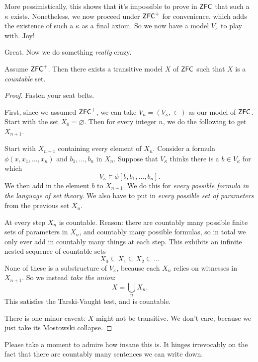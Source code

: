 More pessimistically,
this shows that it's impossible to prove in $\mathsf{ZFC}$ that such a $\kappa$ exists.
Nonetheless, we now proceed under $\mathsf{ZFC}^+$ for convenience,
which adds the existence of such a $\kappa$
as a final axiom.
So we now have a model $V_\kappa$ to play with. Joy!

Great. Now we do something \emph{really} crazy.
\begin{theorem}
	Assume $\mathsf{ZFC}^+$. Then there exists a transitive model $X$ of $\mathsf{ZFC}$
	such that $X$ is a \emph{countable} set.
\end{theorem}
\begin{proof}
	Fasten your seat belts.

	First, since we assumed $\mathsf{ZFC}^+$,
	we can take $V_\kappa = (V_\kappa, \in)$ as our model of $\mathsf{ZFC}$.
	Start with the set $X_0 = \varnothing$.
	Then for every integer $n$, we do the following to get $X_{n+1}$.
	\begin{itemize}
		\ii Start with $X_{n+1}$ containing every element of $X_n$.
		\ii Consider a formula $\phi(x, x_1, \dots, x_n)$
		and $b_1, \dots, b_n$ in $X_n$.
		Suppose that $V_\kappa$ thinks there is a $b \in V_\kappa$ for which
		\[ V_\kappa \vDash \phi[b, b_1, \dots, b_n]. \]
		We then add in the element $b$ to $X_{n+1}$.
		\ii We do this for \emph{every possible formula in the language of set theory}.
		We also have to put in \emph{every possible set of parameters} from the previous set $X_n$.
	\end{itemize}
	At every step $X_n$ is countable.
	Reason: there are countably many possible finite sets of parameters in $X_n$,
	and countably many possible formulas, so in total we only ever add in countably many things
	at each step.
	This exhibits an infinite nested sequence of countable sets
	\[ X_0 \subseteq X_1 \subseteq X_2 \subseteq \dots \]
	None of these is a substructure of $V_\kappa$,
	because each $X_n$ relies on witnesses in $X_{n+1}$.
	So we instead \emph{take the union}:
	\[ X = \bigcup_n X_n. \]
	This satisfies the Tarski-Vaught test, and is countable.

	There is one minor caveat: $X$ might not be transitive.
	We don't care, because we just take its Mostowski collapse.
\end{proof}

Please take a moment to admire how insane this is.
It hinges irrevocably on the fact that there are countably many sentences we can write down.

